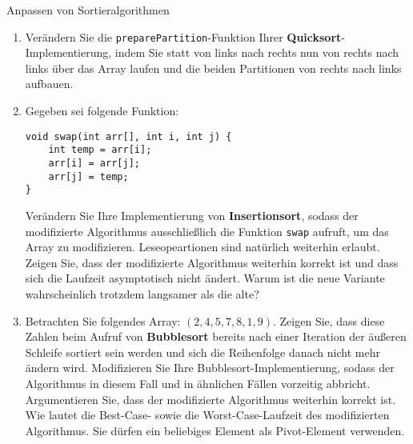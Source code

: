 \documentclass[11pt,a4paper]{article}
\begin{document}
\thispagestyle{empty}




\begin{aufgabe}{1}{Anpassen von Sortieralgorithmen}
    \begin{enumerate}
        \item Verändern Sie die \texttt{preparePartition}-Funktion Ihrer \textbf{Quicksort}-Implementierung, indem Sie statt von links nach rechts nun von rechts nach links über das Array laufen und die beiden Partitionen von rechts nach links aufbauen.

        \item Gegeben sei folgende Funktion:
        \begin{lstlisting}
void swap(int arr[], int i, int j) {
    int temp = arr[i];
    arr[i] = arr[j];
    arr[j] = temp;
} 
        \end{lstlisting}
        Verändern Sie Ihre Implementierung von \textbf{Insertionsort}, sodass der modifizierte Algorithmus ausschließlich die Funktion \texttt{swap} aufruft, um das Array zu modifizieren. Leseopeartionen sind natürlich weiterhin erlaubt.
        Zeigen Sie, dass der modifizierte Algorithmus weiterhin korrekt ist und dass sich die Laufzeit asymptotisch nicht ändert.
        Warum ist die neue Variante wahrscheinlich trotzdem langsamer als die alte?

        \item Betrachten Sie folgendes Array: $(2, 4, 5, 7, 8, 1, 9)$. Zeigen Sie, dass diese Zahlen beim Aufruf von \textbf{Bubble\-sort} bereits nach einer Iteration der äußeren Schleife sortiert sein werden und sich die Reihenfolge danach nicht mehr ändern wird.
        Modifizieren Sie Ihre Bubblesort-Implementierung, sodass der Algorithmus in diesem Fall und in ähnlichen Fällen vorzeitig abbricht.
        Argumentieren Sie, dass der modifizierte Algorithmus weiterhin korrekt ist.
        Wie lautet die Best-Case- sowie die Worst-Case-Laufzeit des modifizierten Algorithmus.
        Sie dürfen ein beliebiges Element als Pivot-Element verwenden.
    \end{enumerate}
\end{aufgabe}
\end{document}
